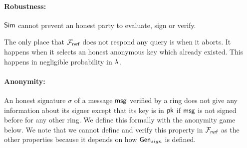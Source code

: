 
\paragraph{Robustness:} $ \mathsf{Sim} $ cannot prevent an honest party to evaluate, sign or verify.

The only place that $ \mathcal{F}_{\textsf{rvrf}} $ does not respond any query is when it aborts. It happens when it selects an honest anonymous key which already existed. This happens in negligible probability in $ \lambda $. 


\paragraph{Anonymity:} An honest signature $ \sigma $ of a message $ \mathsf{msg} $ verified by a ring does not give any information about its signer except that its key is in $ \mathsf{pk} $ if $ \mathsf{msg} $ is not signed before for any other ring. We define this formally with the anonymity game below. We note that we cannot define and verify this property in $ \mathcal{F}_{\textsf{rvrf}} $ as the other properties because it depends on how $ \mathsf{Gen}_{sign} $ is defined.

